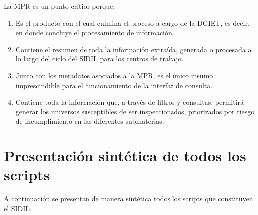\documentclass[
]{article}
\begin{document}
La MPR es un punto crítico porque:

\begin{enumerate}
\def\labelenumi{\arabic{enumi})}
\item
  Es el producto con el cual culmina el proceso a cargo de la DGIET, es decir, en donde concluye el procesamiento de información.
\item
  Contiene el resumen de toda la información extraída, generada o procesada a lo largo del ciclo del SIDIL para los centros de trabajo.
\item
  Junto con los metadatos asociados a la MPR, es el único insumo imprescindible para el funcionamiento de la interfaz de consulta.
\item
  Contiene toda la información que, a través de filtros y consultas, permitirá generar los universos susceptibles de ser inspeccionados, priorizados por riesgo de incumplimiento en las diferentes submaterias.
\end{enumerate}

\hypertarget{presentaciuxf3n-sintuxe9tica-de-todos-los-scripts}{%
\section{Presentación sintética de todos los scripts}\label{presentaciuxf3n-sintuxe9tica-de-todos-los-scripts}}

A continuación se presentan de manera sintética todos los scripts que constituyen el SIDIL.
\end{document}
